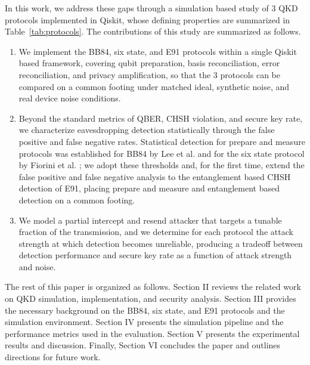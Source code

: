 \documentclass[conference]{IEEEtran}
\begin{document}
In this work, we address these gaps through a simulation based study of 3
QKD protocols implemented in Qiskit, whose defining properties are summarized in Table~\ref{tab:protocols}. The contributions of this study are
summarized as follows.
\begin{enumerate}
\item We implement the BB84, six state, and E91 protocols within a single
Qiskit based framework, covering qubit preparation, basis reconciliation, error
reconciliation, and privacy amplification, so that the 3 protocols can be
compared on a common footing under matched ideal, synthetic noise, and real
device noise conditions.
\item Beyond the standard metrics of QBER, CHSH violation, and secure key rate,
we characterize eavesdropping detection statistically through the false positive
and false negative rates. Statistical detection for prepare and measure
protocols was established for BB84 by Lee et al. \cite{lee2022eavesdropping} and
for the six state protocol by Fiorini et al. \cite{fiorini2025sixstate}; we adopt
these thresholds and, for the first time, extend the false positive and false
negative analysis to the entanglement based CHSH detection of E91, placing
prepare and measure and entanglement based detection on a common footing.
\item We model a partial intercept and resend attacker that targets a tunable
fraction of the transmission, and we determine for each protocol the attack
strength at which detection becomes unreliable, producing a tradeoff between
detection performance and secure key rate as a function of attack strength and
noise.
\end{enumerate}

The rest of this paper is organized as follows. Section II reviews the related
work on QKD simulation, implementation, and security analysis. Section III
provides the necessary background on the BB84, six state, and E91 protocols and
the simulation environment. Section IV presents the simulation pipeline and the
performance metrics used in the evaluation. Section V presents the experimental
results and discussion.
Finally, Section VI concludes the paper and outlines directions for future
work.
\end{document}

